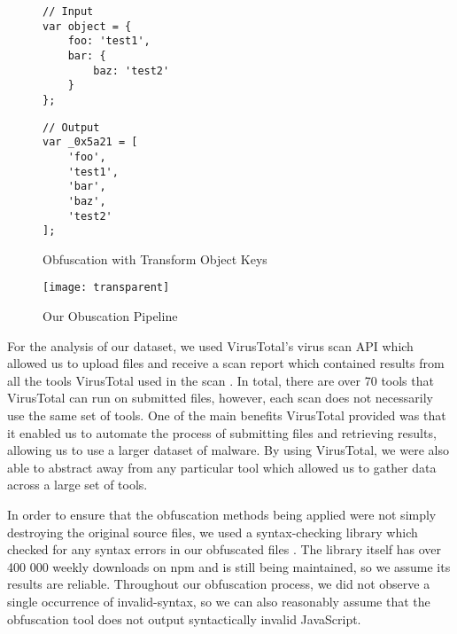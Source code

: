 \documentclass[sigplan,10pt,review, nonacm=true]{acmart}\settopmatter{printfolios=true,printccs=false,printacmref=false}
\begin{document}
\begin{figure}
\caption{Obfuscation with Transform Object Keys}
\label{fig:TOK}
\begin{minipage}[t]{0.45\columnwidth}
\begin{lstlisting}
// Input
var object = {
    foo: 'test1',
    bar: {
        baz: 'test2'
    }
};
\end{lstlisting}
\end{minipage}
\begin{minipage}[t]{0.45\columnwidth}
\begin{lstlisting}
// Output
var _0x5a21 = [
    'foo',
    'test1',
    'bar',
    'baz',
    'test2'
];
\end{lstlisting}
\end{minipage}
\end{figure}
%

\begin{figure*}
    \texttt{[image: transparent]}
    \caption{Our Obuscation Pipeline}
    \label{fig:Pipeline}
\end{figure*}

For the analysis of our dataset, we used VirusTotal's virus scan API which allowed us to upload files and receive a scan report which contained results from all the tools VirusTotal used in the scan \cite{VirusTotal}. In total, there are over 70 tools that VirusTotal can run on submitted files, however, each scan does not necessarily use the same set of tools. One of the main benefits VirusTotal provided was that it enabled us to automate the process of submitting files and retrieving results, allowing us to use a larger dataset of malware. By using VirusTotal, we were also able to abstract away from any particular tool which allowed us to gather data across a large set of tools.

In order to ensure that the obfuscation methods being applied were not simply destroying the original source files, we used a  syntax-checking library which checked for any syntax errors in our obfuscated files \cite{SyntaxChecker}. The library itself has over 400 000 weekly downloads on npm and is still being maintained, so we assume its results are reliable. Throughout our obfuscation process, we did not observe a single occurrence of invalid-syntax, so we can also reasonably assume that the obfuscation tool does not output syntactically invalid JavaScript.
\end{document}
